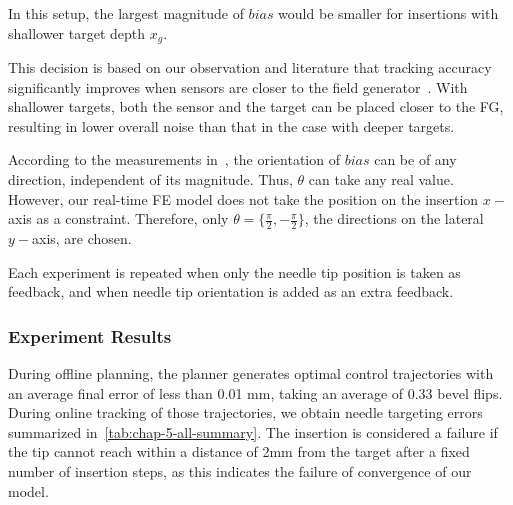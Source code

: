 In this setup, the largest magnitude of $bias$ would be smaller for insertions with shallower target depth $x_g$.

This decision is based on our observation and literature that tracking accuracy significantly improves when sensors are closer to the field generator~\parencite{nakamotoMagnetoOpticHybrid3D2000}. With shallower targets, both the sensor and the target can be placed closer to the FG, resulting in lower overall noise than that in the case with deeper targets.

According to the measurements in~\parencite{sadjadiSimultaneousElectromagneticTracking2016}, the orientation of $bias$ can be of any direction, independent of its magnitude. Thus, $\theta$ can take any real value. However, our real-time FE model does not take the position on the insertion $x-$axis as a constraint. Therefore, only $\theta = \{\frac{\pi}{2},-\frac{\pi}{2}\}$, the directions on the lateral $y-$axis, are chosen.

Each experiment is repeated when only the needle tip position is taken as feedback, and when needle tip orientation is added as an extra feedback.

\subsubsection{Experiment Results}
\label{sec:chap-5-sim-exp-results}

During offline planning, the planner generates optimal control trajectories with an average final error of less than 0.01 mm, taking an average of $0.33$ bevel flips. During online tracking of those trajectories, we obtain needle targeting errors summarized in~\cref{tab:chap-5-all-summary}. The insertion is considered a failure if the tip cannot reach within a distance of 2mm from the target after a fixed number of insertion steps, as this indicates the failure of convergence of our model.

